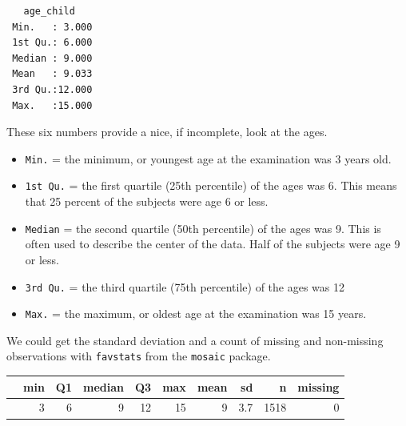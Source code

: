 \documentclass[
]{book}
\newenvironment{Shaded}{\begin{snugshade}}{\end{snugshade}}
\newcommand{\DataTypeTok}[1]{\textcolor[rgb]{0.13,0.29,0.53}{#1}}
\newcommand{\DecValTok}[1]{\textcolor[rgb]{0.00,0.00,0.81}{#1}}
\newcommand{\KeywordTok}[1]{\textcolor[rgb]{0.13,0.29,0.53}{\textbf{#1}}}
\newcommand{\NormalTok}[1]{#1}
\newcommand{\OperatorTok}[1]{\textcolor[rgb]{0.81,0.36,0.00}{\textbf{#1}}}
\newcommand{\StringTok}[1]{\textcolor[rgb]{0.31,0.60,0.02}{#1}}
\providecommand{\tightlist}{%
  \setlength{\itemsep}{0pt}\setlength{\parskip}{0pt}}
\begin{document}
\begin{Shaded}
\end{Shaded}

\begin{verbatim}
   age_child     
 Min.   : 3.000  
 1st Qu.: 6.000  
 Median : 9.000  
 Mean   : 9.033  
 3rd Qu.:12.000  
 Max.   :15.000  
\end{verbatim}

These six numbers provide a nice, if incomplete, look at the ages.

\begin{itemize}
\tightlist
\item
  \texttt{Min.} = the minimum, or youngest age at the examination was 3 years old.
\item
  \texttt{1st\ Qu.} = the first quartile (25th percentile) of the ages was 6. This means that 25 percent of the subjects were age 6 or less.
\item
  \texttt{Median} = the second quartile (50th percentile) of the ages was 9. This is often used to describe the center of the data. Half of the subjects were age 9 or less.
\item
  \texttt{3rd\ Qu.} = the third quartile (75th percentile) of the ages was 12
\item
  \texttt{Max.} = the maximum, or oldest age at the examination was 15 years.
\end{itemize}

We could get the standard deviation and a count of missing and non-missing observations with \texttt{favstats} from the \texttt{mosaic} package.

\begin{Shaded}
\end{Shaded}

\begin{tabular}{l|r|r|r|r|r|r|r|r|r}
\hline
  & min & Q1 & median & Q3 & max & mean & sd & n & missing\\
\hline
 & 3 & 6 & 9 & 12 & 15 & 9 & 3.7 & 1518 & 0\\
\hline
\end{tabular}
\end{document}
